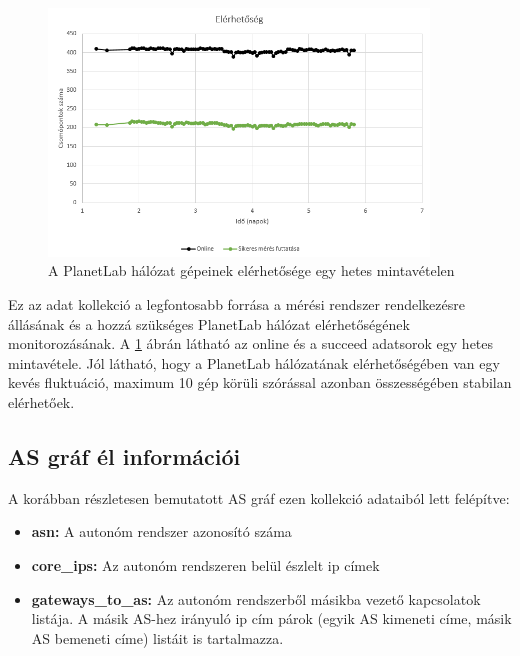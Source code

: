 \begin{figure}[!ht]
	\centering
	\includegraphics[width=0.9\textwidth, keepaspectratio]{figures/availability.PNG}
	\caption{A PlanetLab hálózat gépeinek elérhetősége egy hetes mintavételen}
	\label{fig:availability}
\end{figure}

Ez az adat kollekció a legfontosabb forrása a mérési rendszer rendelkezésre állásának és a hozzá szükséges PlanetLab hálózat elérhetőségének monitorozásának. A \ref{fig:availability} ábrán látható az online és a succeed adatsorok egy hetes mintavétele. Jól látható, hogy a PlanetLab hálózatának elérhetőségében van egy kevés fluktuáció, maximum 10 gép körüli szórással azonban összességében stabilan elérhetőek.



\subsection*{AS gráf él információi}
A korábban részletesen bemutatott AS gráf ezen kollekció adataiból lett felépítve:

\begin{itemize}
\item \textbf{asn:} A autonóm rendszer azonosító száma
\item \textbf{core\_ips:} Az autonóm rendszeren belül észlelt ip címek
\item \textbf{gateways\_to\_as:} Az autonóm rendszerből másikba vezető kapcsolatok listája. A másik AS-hez irányuló ip cím párok (egyik AS kimeneti címe, másik AS bemeneti címe) listáit is tartalmazza.
\end{itemize}



